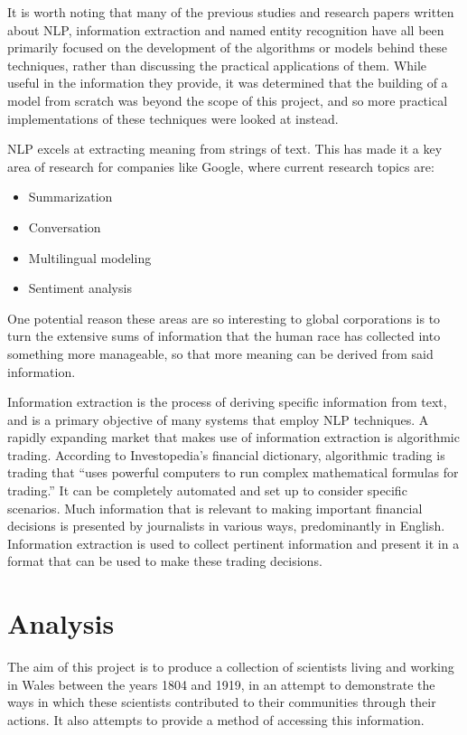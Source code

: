 \documentclass[11pt,a4paper]{book}
\begin{document}
It is worth noting that many of the previous studies and research papers written about NLP, information extraction and named entity recognition have all been primarily focused on the development of the algorithms or models behind these techniques, rather than discussing the practical applications of them. While useful in the information they provide, it was determined that the building of a model from scratch was beyond the scope of this project, and so more practical implementations of these techniques were looked at instead. 

NLP excels at extracting meaning from strings of text. This has made it a key area of research for companies like Google\cite{noauthor_language_nodate}, where current research topics are:
\begin{itemize}
	\item Summarization
	\item Conversation
	\item Multilingual modeling
	\item Sentiment analysis
\end{itemize}
One potential reason these areas are so interesting to global corporations is to turn the extensive sums of information that the human race has collected into something more manageable, so that more meaning can be derived from said information. 

Information extraction is the process of deriving specific information from text, and is a primary objective of many systems that employ NLP techniques. A rapidly expanding market that makes use of information extraction is algorithmic trading. According to Investopedia's financial dictionary, algorithmic trading is trading that ``uses powerful computers to run complex mathematical formulas for trading.''\cite{investopedia} It can be completely automated and set up to consider specific scenarios. Much information that is relevant to making important financial decisions is presented by journalists in various ways, predominantly in English. Information extraction is used to collect pertinent information and present it in a format that can be used to make these trading decisions.  

\section{Analysis}
The aim of this project is to produce a collection of scientists living and working in Wales between the years 1804 and 1919, in an attempt to demonstrate the ways in which these scientists contributed to their communities through their actions. It also attempts to provide a method of accessing this information. 
\end{document}

